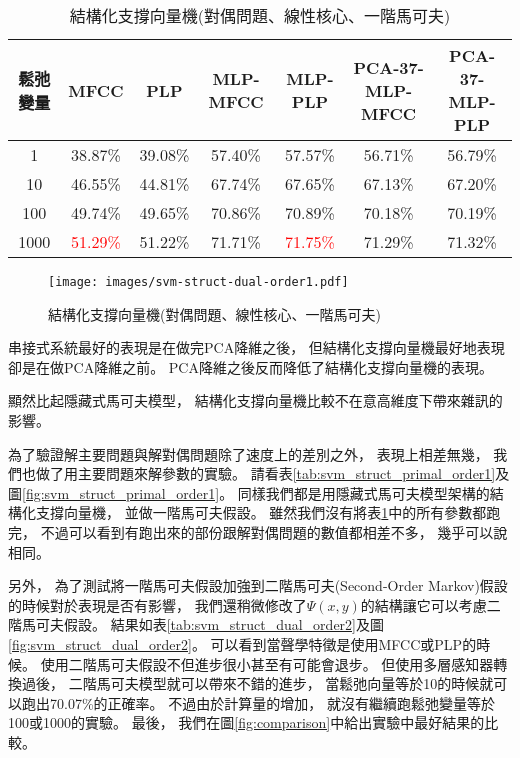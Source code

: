     \begin{table}[htb]
      \begin{center}
	\scalebox{0.75} 
	{
	  \begin{tabular}{|c|c|c|c|c|c|c|}
	  \hline
	  鬆弛變量 & MFCC & PLP & MLP-MFCC & MLP-PLP & PCA-37-MLP-MFCC & PCA-37-MLP-PLP \\
	  \hline 
	  1 & 38.87\% & 39.08\% & 57.40\% & 57.57\% & 56.71\% & 56.79\% \\ 
	  \hline 
	  10 & 46.55\% & 44.81\% & 67.74\% & 67.65\% & 67.13\% & 67.20\% \\
	  \hline 
	  100 & 49.74\% & 49.65\% &70.86\% & 70.89\% & 70.18\% & 70.19\% \\
	  \hline 
	  1000 & \textcolor{red}{51.29\%} & 51.22\% & 71.71\% & \textcolor{red}{71.75\%} & 71.29\% & 71.32\% \\
	  \hline
	  \end{tabular} 
	}
      \end{center}
      \caption{結構化支撐向量機(對偶問題、線性核心、一階馬可夫)}
      \label{tab:svm_struct_dual_order1}
    \end{table}

    \begin{figure}
      \begin{center}
	\texttt{[image: images/svm-struct-dual-order1.pdf]}
      \end{center}
      \caption{結構化支撐向量機(對偶問題、線性核心、一階馬可夫)}
      \label{fig:svm_struct_dual_order1}
    \end{figure}

    \newpage
    串接式系統最好的表現是在做完PCA降維之後，
    但結構化支撐向量機最好地表現卻是在做PCA降維之前。
    PCA降維之後反而降低了結構化支撐向量機的表現。

    顯然比起隱藏式馬可夫模型，
    結構化支撐向量機比較不在意高維度下帶來雜訊的影響。

    為了驗證解主要問題與解對偶問題除了速度上的差別之外，
    表現上相差無幾，
    我們也做了用主要問題來解參數的實驗。
    請看表\ref{tab:svm_struct_primal_order1}及圖\ref{fig:svm_struct_primal_order1}。
    同樣我們都是用隱藏式馬可夫模型架構的結構化支撐向量機，
    並做一階馬可夫假設。
    雖然我們沒有將表\ref{tab:svm_struct_dual_order1}中的所有參數都跑完，
    不過可以看到有跑出來的部份跟解對偶問題的數值都相差不多，
    幾乎可以說相同。

    另外，
    為了測試將一階馬可夫假設加強到二階馬可夫(Second-Order Markov)假設的時候對於表現是否有影響，
    我們還稍微修改了$\Psi(x,y)$的結構讓它可以考慮二階馬可夫假設。
    結果如表\ref{tab:svm_struct_dual_order2}及圖\ref{fig:svm_struct_dual_order2}。
    可以看到當聲學特徵是使用MFCC或PLP的時候。
    使用二階馬可夫假設不但進步很小甚至有可能會退步。
    但使用多層感知器轉換過後，
    二階馬可夫模型就可以帶來不錯的進步，
    當鬆弛向量等於10的時候就可以跑出70.07\%的正確率。
    不過由於計算量的增加，
    就沒有繼續跑鬆弛變量等於100或1000的實驗。
    最後，
    我們在圖\ref{fig:comparison}中給出實驗中最好結果的比較。
    \newpage

